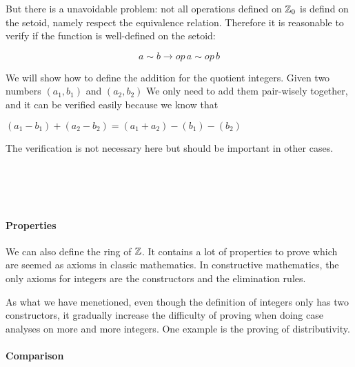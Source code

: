 But there is a unavoidable problem: not all operations defined on
$\mathbb{Z}_0$ is defind on the setoid, namely respect the equivalence
relation. Therefore it is reasonable to verify if the function is
well-defined on the setoid:

$$a \sim b → op \, a \sim op \, b$$

We will show how to define the addition for the quotient
integers. Given two numbers $(a_1 , b_1)$ and $(a_2 , b_2)$ We
only need to add them pair-wisely together, and it can be verified
easily because we know that 

$(a_1 - b_1) + (a_2 - b_2) = (a_1 + a_2) - (b_1) - (b_2)$

The verification is not necessary here but should be important in
other cases.

\begin{code}
\\
\>\AgdaFunction{\_+\_} \AgdaSymbol{:}     \<%
\\
\>\AgdaSymbol{(} \AgdaInductiveConstructor{,} \AgdaSymbol{)} \AgdaFunction{+} \AgdaSymbol{(} \AgdaInductiveConstructor{,} \AgdaSymbol{)} \AgdaSymbol{=} \AgdaSymbol{(}  \AgdaSymbol{)} \AgdaInductiveConstructor{,} \AgdaSymbol{(}  \AgdaSymbol{)}\<%
\\
\end{code}


\paragraph{Properties}

We can also define the ring of $\mathbb{Z}$. It contains a lot of properties
to prove which are seemed as axioms in classic mathematics. In
constructive mathematics, the only axioms for integers are the
constructors and the elimination rules.

As what we have menetioned, even though the definition of integers
only has two constructors, it gradually increase the difficulty of
proving when doing case analyses on more and more integers. One
example is the proving of distributivity.

\paragraph{Comparison}

